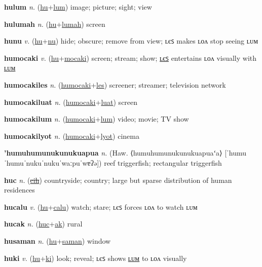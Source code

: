 \textbf{\hypertarget{hulum}{hulum}} \textit{n.} (\hyperlink{hu}{hu}+\allowbreak \hyperlink{lum}{lum})
image; picture; sight; view

\textbf{\hypertarget{hulumah}{hulumah}} \textit{n.} (\hyperlink{hu}{hu}+\allowbreak \hyperlink{lumah}{lumah})
screen

\textbf{\hypertarget{hunu}{hunu}} \textit{v.} (\hyperlink{hu}{hu}+\allowbreak \hyperlink{nu}{nu})
hide; obscure; remove from view; ʟєꜱ makes ʟᴏᴧ stop seeing ʟᴜᴍ

\textbf{\hypertarget{humocaki}{humocaki}} \textit{v.} (\hyperlink{hu}{hu}+\allowbreak \hyperlink{mocaki}{mocaki})
screen; stream; show; \hyperlink{humocakiles}{ʟєꜱ} entertains ʟᴏᴧ visually with \hyperlink{humocakilum}{ʟᴜᴍ}

\textbf{\hypertarget{humocakiles}{humocakiles}} \textit{n.} (\hyperlink{humocaki}{humocaki}+\allowbreak \hyperlink{les}{les})
screener; streamer; television network

\textbf{\hypertarget{humocakiluat}{humocakiluat}} \textit{n.} (\hyperlink{humocaki}{humocaki}+\allowbreak \hyperlink{luat}{luat})
screen

\textbf{\hypertarget{humocakilum}{humocakilum}} \textit{n.} (\hyperlink{humocaki}{humocaki}+\allowbreak \hyperlink{lum}{lum})
video; movie; TV show

\textbf{\hypertarget{humocakilyot}{humocakilyot}} \textit{n.} (\hyperlink{humocaki}{humocaki}+\allowbreak \hyperlink{lyot}{lyot})
cinema

\textbf{\hypertarget{'humuhumunukunukuapua}{'humuhumunukunukuapua}} \textit{n.} (Haw. ⟨humuhumunukunukuapuaʻa⟩ [ˈhumuˈhumuˈnukuˈnukuˈwaːpuˈwɐʔə])
reef triggerfish; rectangular triggerfish

\textbf{\hypertarget{huc}{huc}} \textit{n.} (\hyperlink{cih}{\sout{cih}})
countryside; country; large but sparse distribution of human residences

\textbf{\hypertarget{hucalu}{hucalu}} \textit{v.} (\hyperlink{hu}{hu}+\allowbreak \hyperlink{calu}{calu})
watch; stare; ʟєꜱ forces ʟᴏᴧ to watch ʟᴜᴍ

\textbf{\hypertarget{hucak}{hucak}} \textit{n.} (\hyperlink{huc}{huc}+\allowbreak \hyperlink{ak}{ak})
rural

\textbf{\hypertarget{husaman}{husaman}} \textit{n.} (\hyperlink{hu}{hu}+\allowbreak \hyperlink{saman}{saman})
window

\textbf{\hypertarget{huki}{huki}} \textit{v.} (\hyperlink{hu}{hu}+\allowbreak \hyperlink{ki}{ki})
look; reveal; ʟєꜱ shows \hyperlink{hukilum}{ʟᴜᴍ} to ʟᴏᴧ visually

